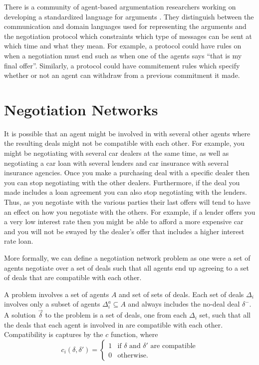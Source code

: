 There is a community of agent-based argumentation researchers working
on developing a standardized language for arguments
\cite{chesnevar06a,rahwan04a}. They distinguish between the
communication and domain languages used for representing the arguments
and the negotiation protocol which constraints which type of messages
can be sent at which time and what they mean. For example, a protocol
could have rules on when a negotiation must end such as when one of
the agents says ``that is my final offer''. Similarly, a protocol
could have commitement rules which specify whether or not an agent can
withdraw from a previous commitment it made.


\section{Negotiation Networks}
\label{sec:negotiation-networks}


It is possible that an agent might be involved in  with several other agents where the resulting deals
might not be compatible with each other. For example, you might be
negotiating with several car dealers at the same time, as well as
negotiating a car loan with several lenders and car insurance with
several insurance agencies. Once you make a purchasing deal with a
specific dealer then you can stop negotiating with the other dealers.
Furthermore, if the deal you made includes a loan agreement you can
also stop negotiating with the lenders. Thus, as you negotiate with
the various parties their last offers will tend to have an effect on
how you negotiate with the others. For example, if a lender offers you
a very low interest rate then you might be able to afford a more
expensive car and you will not be swayed by the dealer's offer that
includes a higher interest rate loan.

More formally, we can define a negotiation network problem as one
were a set of agents negotiate over a set of deals such that all
agents end up agreeing to a set of deals that are compatible with each
other.
\begin{definition}
  A  problem involves a set of agents $A$ and
  set of sets of deals. Each set of deals $\Delta_i$ involves only a
  subset of agents $\Delta_i^a \subseteq A$ and always includes the
  no-deal deal $\delta^-$. A solution $\vec{\delta}$ to the problem is
  a set of deals, one from each $\Delta_i$ set, such that all the
  deals that each agent is involved in are compatible with each
  other. Compatibility is captures by the $c$ function, where \[
  c_i(\delta,\delta') =  \left\{
  \begin{matrix}
    1 & \text{if $\delta$ and $\delta'$ are compatible} \\
    0 & \text{otherwise.}
  \end{matrix}\right.
  \]
\end{definition}

